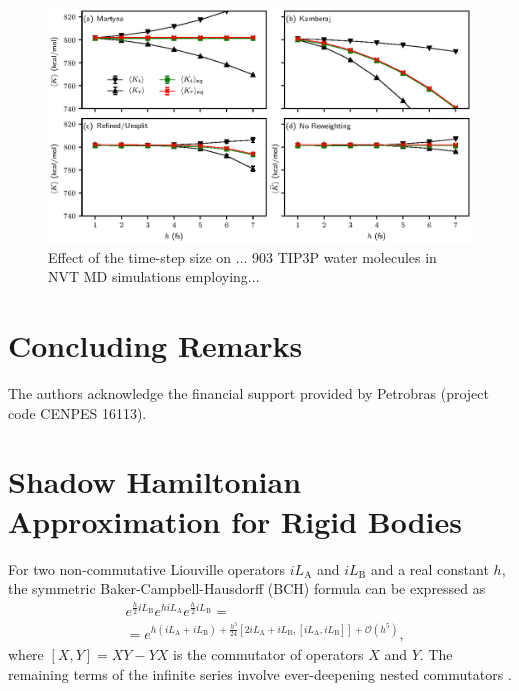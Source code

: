 \documentclass[
journal=jctcce,
layout=twocolumn
]{achemso}
\newcommand{\Liu}[1]{i\!L_\text{#1}}            %
\newcommand{\timestep}{h}
\begin{document}
\begin{figure}
	\includegraphics{Figures/energy_partition.eps}
		\caption{Effect of the time-step size on ... 903 TIP3P\cite{Jorgensen_1983} water molecules in NVT MD simulations employing...}
	\label{fig:energy_partition}
\end{figure}


\section{Concluding Remarks}
\label{sec:conclusion}

\begin{acknowledgement}
	The authors acknowledge the financial support provided by Petrobras (project code CENPES 16113).
\end{acknowledgement}

\appendix
{}

\section{Shadow Hamiltonian Approximation for Rigid Bodies}
\label{sec:rigid body shadow hamiltonian}

For two non-commutative Liouville operators $\Liu A$ and $\Liu B$ and a real constant $\timestep$, the symmetric Baker-Campbell-Hausdorff (BCH) formula can be expressed as \cite{Hairer_2006}
\begin{equation}
\label{eq:symmetric BCH}
\begin{split}
&e^{\frac{\timestep}{2} \Liu B} e^{\timestep \Liu A} e^{\frac{\timestep}{2} \Liu B} = \\
&= e^{\timestep (\Liu A + \Liu B) + \frac{\timestep^3}{24} \left[2 \Liu A + \Liu B,[\Liu A,\Liu B]\right] + \mathcal{O}(\timestep^5)},
\end{split}
\end{equation}
where $[X,Y] = XY - YX$ is the commutator of operators $X$ and $Y$.
The remaining terms of the infinite series involve ever-deepening nested commutators \cite{Hairer_2006}.
\end{document}
